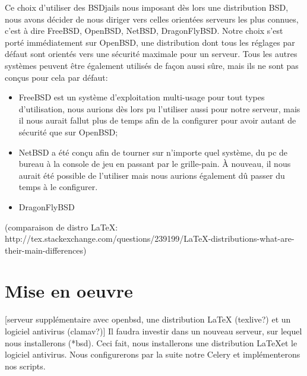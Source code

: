 \documentclass[10pt,a4paper]{article}
\begin{document}
Ce choix d'utiliser des BSDjails nous imposant dès lors une distribution BSD, nous avons décider de nous diriger vers celles orientées serveurs les plus connues,
c'est à dire FreeBSD, OpenBSD, NetBSD, DragonFlyBSD.
Notre choix s'est porté immédiatement sur OpenBSD, une distribution dont tous les réglages par défaut sont orientés vers une sécurité maximale pour un serveur. Tous les autres systèmes peuvent être également utilisés de façon aussi sûre, mais ils ne sont pas conçus pour cela par défaut:
    \begin{itemize}
    \item FreeBSD est un système d'exploitation multi-usage pour tout types d'utilisation, nous aurions dès lors pu l'utiliser aussi pour notre serveur, mais il nous aurait fallut plus de temps afin de la configurer pour avoir autant de sécurité que sur OpenBSD;
    \item NetBSD a été conçu afin de tourner sur n'importe quel système, du pc de bureau à la console de jeu en passant par le grille-pain. À nouveau, il nous aurait été possible de l'utiliser mais nous aurions également dû passer du temps à le configurer.
    \item DragonFlyBSD
    \end{itemize}
(comparaison de distro LaTeX: http://tex.stackexchange.com/questions/239199/LaTeX-distributions-what-are-their-main-differences)

\section{Mise en oeuvre}
[serveur supplémentaire avec openbsd, une distribution LaTeX (texlive?) et un logiciel antivirus (clamav?)]
Il faudra investir dans un nouveau serveur, sur lequel nous installerons (*bsd). Ceci fait, nous installerons une distribution \LaTeX et le logiciel antivirus.
Nous configurerons par la suite notre Celery et implémenterons nos scripts.
\end{document}
